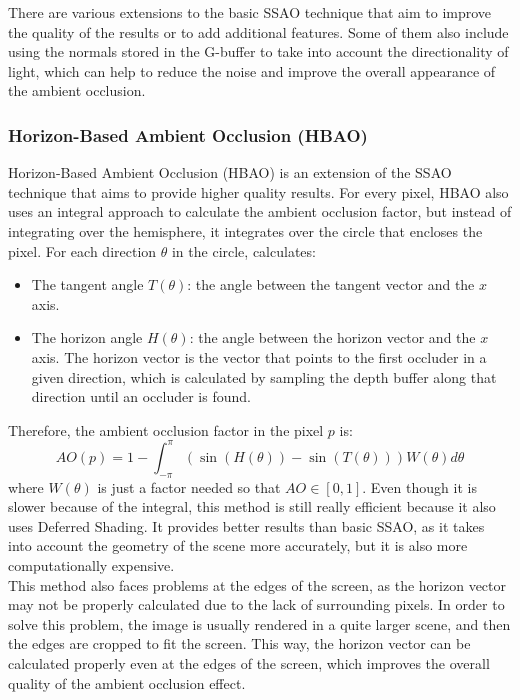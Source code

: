 There are various extensions to the basic SSAO technique that aim to improve the quality of the results or to add additional features. Some of them also include using the normals stored in the G-buffer to take into account the directionality of light, which can help to reduce the noise and improve the overall appearance of the ambient occlusion. 


\subsubsection{Horizon-Based Ambient Occlusion (HBAO)}

Horizon-Based Ambient Occlusion (HBAO) is an extension of the SSAO technique that aims to provide higher quality results. For every pixel, HBAO also uses an integral approach to calculate the ambient occlusion factor, but instead of integrating over the hemisphere, it integrates over the circle that encloses the pixel. For each direction $\theta$ in the circle, calculates:
\begin{itemize}
    \item The tangent angle $T(\theta)$: the angle between the tangent vector and the $x$ axis.
    \item The horizon angle $H(\theta)$: the angle between the horizon vector and the $x$ axis. The horizon vector is the vector that points to the first occluder in a given direction, which is calculated by sampling the depth buffer along that direction until an occluder is found.
\end{itemize}

Therefore, the ambient occlusion factor in the pixel $p$ is:
\begin{equation*}
    AO(p) = 1 - \int_{-\pi}^{\pi} \left(\sin(H(\theta)) - \sin(T(\theta))\right) W(\theta) d\theta
\end{equation*}
where $W(\theta)$ is just a factor needed so that $AO\in [0,1]$. Even though it is slower because of the integral, this method is still really efficient because it also uses Deferred Shading. It provides better results than basic SSAO, as it takes into account the geometry of the scene more accurately, but it is also more computationally expensive.\\

This method also faces problems at the edges of the screen, as the horizon vector may not be properly calculated due to the lack of surrounding pixels. In order to solve this problem, the image is usually rendered in a quite larger scene, and then the edges are cropped to fit the screen. This way, the horizon vector can be calculated properly even at the edges of the screen, which improves the overall quality of the ambient occlusion effect.